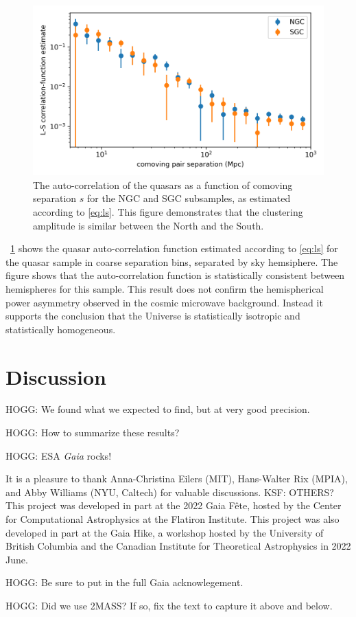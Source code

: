 \documentclass[modern]{aastex631}
\newlength{\figurewidth}
\newcommand{\figref}[1]{\figurename~\ref{#1}}
\begin{document}
\begin{figure}[t!]
  \begin{mdframed}
  \color{captiongray}
  \begin{center}
    \includegraphics[width=\figurewidth]{notebooks/corrfunc.png}
  \end{center}
    \caption{The auto-correlation of the quasars as a function of comoving separation $s$ for the NGC and SGC subsamples, as estimated according to \eqref{eq:ls}.
    This figure demonstrates that the clustering amplitude is similar between the North and the South.\label{fig:corrfunc}}
  \end{mdframed}
\end{figure}
\figref{fig:corrfunc} shows the quasar auto-correlation function estimated according to \eqref{eq:ls} for the quasar sample in coarse separation bins, separated by sky hemsiphere.
The figure shows that the auto-correlation function is statistically consistent between hemispheres for this sample.
This result does not confirm the hemispherical power asymmetry observed in the cosmic microwave background.
Instead it supports the conclusion that the Universe is statistically isotropic and statistically homogeneous.

\section{Discussion}\label{sec:discuss}\noindent
HOGG: We found what we expected to find, but at very good precision.

HOGG: How to summarize these results?

HOGG: ESA \textsl{Gaia} rocks!

\begin{acknowledgements}
It is a pleasure to thank
  Anna-Christina Eilers (MIT),
  Hans-Walter Rix (MPIA), and
  Abby Williams (NYU, Caltech) for valuable discussions. KSF: OTHERS?
This project was developed in part at the 2022 Gaia F\^ete, hosted by the Center for Computational Astrophysics at the Flatiron Institute.
This project was also developed in part at the Gaia Hike, a workshop hosted by the University of British Columbia and the Canadian Institute for Theoretical Astrophysics in 2022 June.

HOGG: Be sure to put in the full Gaia acknowlegement.

HOGG: Did we use 2MASS? If so, fix the text to capture it above and below.
\end{acknowledgements}
\end{document}
